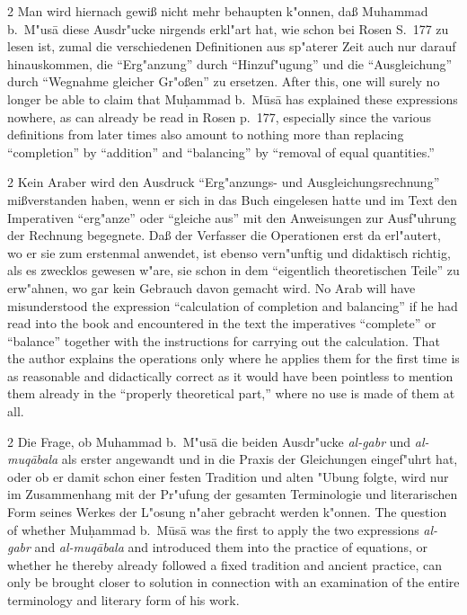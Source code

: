 \documentclass[10pt,a4paper]{article}
\renewcommand{\switchcolumn}{\syncronize\nointerlineskip\columnbreak}
\newcommand{\enquote}[1]{``#1''}
\begin{document}
\begin{paracol}{2}
Man wird hiernach gewi\ss{} nicht mehr behaupten k"onnen, da\ss{} Muhammad b.\ M"us\=a diese Ausdr"ucke nirgends erkl"art hat, wie schon bei Rosen S.\ 177 zu lesen ist, zumal die verschiedenen Definitionen aus sp"aterer Zeit auch nur darauf hinauskommen, die \enquote{Erg"anzung} durch \enquote{Hinzuf"ugung} und die \enquote{Ausgleichung} durch \enquote{Wegnahme gleicher Gr"o\ss{}en} zu ersetzen.
\switchcolumn
After this, one will surely no longer be able to claim that Mu\d{h}ammad b.\ M\=us\=a has explained these expressions nowhere, as can already be read in Rosen p.\ 177, especially since the various definitions from later times also amount to nothing more than replacing ``completion'' by ``addition'' and ``balancing'' by ``removal of equal quantities.''
\end{paracol}

\begin{paracol}{2}
Kein Araber wird den Ausdruck \enquote{Erg"anzungs- und Ausgleichungsrechnung} mi\ss{}verstanden haben, wenn er sich in das Buch eingelesen hatte und im Text den Imperativen \enquote{erg"anze} oder \enquote{gleiche aus} mit den Anweisungen zur Ausf"uhrung der Rechnung begegnete. Da\ss{} der Verfasser die Operationen erst da erl"autert, wo er sie zum erstenmal anwendet, ist ebenso vern"unftig und didaktisch richtig, als es zwecklos gewesen w"are, sie schon in dem \enquote{eigentlich theoretischen Teile} zu erw"ahnen, wo gar kein Gebrauch davon gemacht wird.
\switchcolumn
No Arab will have misunderstood the expression ``calculation of completion and balancing'' if he had read into the book and encountered in the text the imperatives ``complete'' or ``balance'' together with the instructions for carrying out the calculation. That the author explains the operations only where he applies them for the first time is as reasonable and didactically correct as it would have been pointless to mention them already in the ``properly theoretical part,'' where no use is made of them at all.
\end{paracol}

\begin{paracol}{2}
Die Frage, ob Muhammad b.\ M"us\=a die beiden Ausdr"ucke \textit{al-gabr} und \textit{al-muq\=abala} als erster angewandt und in die Praxis der Gleichungen eingef"uhrt hat, oder ob er damit schon einer festen Tradition und alten "Ubung folgte, wird nur im Zusammenhang mit der Pr"ufung der gesamten Terminologie und literarischen Form seines Werkes der L"osung n"aher gebracht werden k"onnen.
\switchcolumn
The question of whether Mu\d{h}ammad b.\ M\=us\=a was the first to apply the two expressions \textit{al-gabr} and \textit{al-muq\=abala} and introduced them into the practice of equations, or whether he thereby already followed a fixed tradition and ancient practice, can only be brought closer to solution in connection with an examination of the entire terminology and literary form of his work.
\end{paracol}
\end{document}
